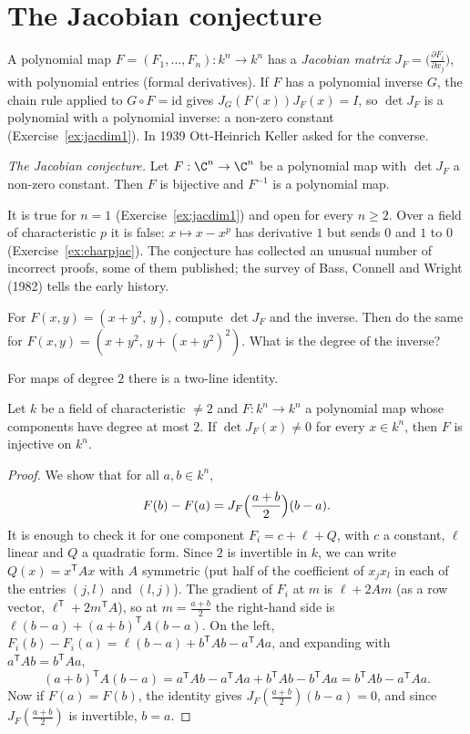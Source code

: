 \section{The Jacobian conjecture}

A polynomial map $F=(F_1,\dots,F_n):k^n\to k^n$ has a \emph{Jacobian matrix} $J_F=\bigl(\frac{\partial F_i}{\partial x_j}\bigr)$, with polynomial
entries (formal derivatives). If $F$ has a polynomial inverse $G$, the chain rule applied to $G\circ F=\mathrm{id}$ gives $J_G(F(x))J_F(x)=I$, so
$\det J_F$ is a polynomial with a polynomial inverse: a non-zero constant (Exercise~\ref{ex:jacdim1}). In 1939 Ott-Heinrich Keller asked for the converse.

\begin{center}
\emph{The Jacobian conjecture.} Let $F:\C^n\to\C^n$ be a polynomial map with $\det J_F$ a non-zero constant. Then $F$ is bijective and $F^{-1}$ is a
polynomial map.
\end{center}

It is true for $n=1$ (Exercise~\ref{ex:jacdim1}) and open for every $n\ge2$. Over a field of characteristic $p$ it is false: $x\mapsto x-x^p$ has derivative
$1$ but sends $0$ and $1$ to $0$ (Exercise~\ref{ex:charpjac}). The conjecture has collected an unusual number of incorrect proofs, some of them published;
the survey of Bass, Connell and Wright (1982) tells the early history.

\begin{think}
For $F(x,y)=(x+y^2,\,y)$, compute $\det J_F$ and the inverse. Then do the same for $F(x,y)=(x+y^2,\,y+(x+y^2)^2)$. What is the degree of the inverse?
\end{think}

For maps of degree $2$ there is a two-line identity.

\begin{theorem}[Wang, 1980]\label{thm:wang}
Let $k$ be a field of characteristic $\ne2$ and $F:k^n\to k^n$ a polynomial map whose components have degree at most $2$. If $\det J_F(x)\ne0$ for every
$x\in k^n$, then $F$ is injective on $k^n$.
\end{theorem}
\begin{proof}
We show that for all $a,b\in k^n$,
\[
F(b)-F(a)=J_F\Bigl(\frac{a+b}2\Bigr)(b-a).
\]
It is enough to check it for one component $F_i=c+\ell+Q$, with $c$ a constant, $\ell$ linear and $Q$ a quadratic form. Since $2$ is invertible in $k$, we can
write $Q(x)=x^{\mathsf T}Ax$ with $A$ symmetric (put half of the coefficient of $x_jx_l$ in each of the entries $(j,l)$ and $(l,j)$). The gradient of $F_i$
at $m$ is $\ell+2Am$ (as a row vector, $\ell^{\mathsf T}+2m^{\mathsf T}A$), so at $m=\frac{a+b}2$ the right-hand side is $\ell(b-a)+(a+b)^{\mathsf T}A(b-a)$.
On the left, $F_i(b)-F_i(a)=\ell(b-a)+b^{\mathsf T}Ab-a^{\mathsf T}Aa$, and expanding with $a^{\mathsf T}Ab=b^{\mathsf T}Aa$,
\[
(a+b)^{\mathsf T}A(b-a)=a^{\mathsf T}Ab-a^{\mathsf T}Aa+b^{\mathsf T}Ab-b^{\mathsf T}Aa=b^{\mathsf T}Ab-a^{\mathsf T}Aa.
\]
Now if $F(a)=F(b)$, the identity gives $J_F(\frac{a+b}2)(b-a)=0$, and since $J_F(\frac{a+b}2)$ is invertible, $b=a$.
\end{proof}

